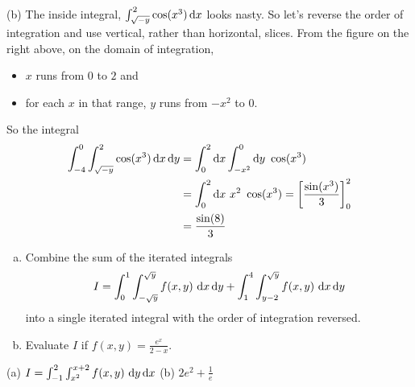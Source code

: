 \begin{solution}
(b) The inside integral, $\int_{\sqrt{-y}}^2 \cos(x^3)\,\mathrm{d}x$
looks nasty. So let's reverse the order of integration and use vertical,
rather than horizontal, slices. From the
figure on the right above, on the domain of integration,
\begin{itemize}
\item 
  $x$ runs from $0$ to $2$ and
\item
  for each $x$ in that range, $y$ runs from $-x^2$ 
  to $0$.
\end{itemize}
So the integral
\begin{align*}
\int_{-4}^0\int_{\sqrt{-y}}^2 \cos(x^3)\,\mathrm{d}x\,\mathrm{d}y
&=\int_0^2\mathrm{d}x\int_{-x^2}^0\mathrm{d}y\ \cos(x^3) \\
&=\int_0^2\mathrm{d}x\ x^2\ \cos(x^3) 
=\left[\frac{\sin(x^3)}{3}\right]_0^2 \\
&=\frac{\sin(8)}{3}
\end{align*}
\end{solution}


\begin{question}[M200 2012A] %
\begin{enumerate}[(a)]
\item
Combine the sum of the iterated integrals
\begin{equation*}
I = \int_0^1\int_{-\sqrt{y}}^{\sqrt{y}} f(x,y)\ \dee{x}\,\dee{y}
   + \int_1^4\int_{y-2}^{\sqrt{y}} f(x,y)\ \dee{x}\,\dee{y}
\end{equation*}
into a single iterated integral with the order of integration reversed.
\item
Evaluate $I$ if $f(x,y)=\frac{e^x}{2-x}$.
\end{enumerate}
\end{question}

%

\begin{answer}
(a) $I = \int_{-1}^2\int_{x^2}^{x+2} f(x,y)\ \mathrm{d}y\,\mathrm{d}x$\qquad
(b) $ 2e^2 + \frac{1}{e}$
\end{answer}

